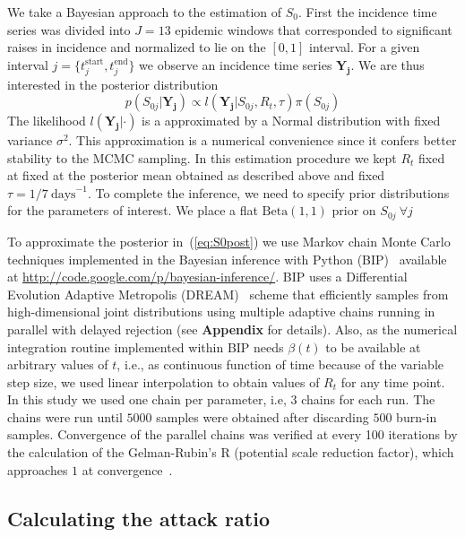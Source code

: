 \documentclass[10pt]{article}
\begin{document}
We take a Bayesian approach to the estimation of $S_0$.
First the incidence time series was divided into $J=13$ 
epidemic windows that corresponded to significant raises in incidence and 
normalized to lie on the $[0,1]$ interval.
For a given interval $j = \{ t_j^{\text{start}}, t_j^{\text{end}} \} $ we 
observe an incidence time series $\mathbf{Y_{j}}$.
We are thus interested in the posterior distribution
\begin{equation}
 \label{eq:S0post}
 p(S_{0j}|\mathbf{Y_{j}}) \propto l(\mathbf{Y_{j}}|S_{0j}, R_t, \tau 
)\pi(S_{0j}) 
\end{equation}
The likelihood $l(\mathbf{Y_{j}}|\cdot)$ is a approximated by a Normal 
distribution with fixed variance $\sigma^2$. This approximation is a numerical 
convenience since it confers better stability to the MCMC sampling.
In this estimation procedure we kept $R_t$ fixed at fixed at the posterior mean 
obtained as described above and fixed $\tau = 1/7\: \text{days}^{-1}$.
To complete the inference, we need to specify prior distributions for the 
parameters of interest.
We place a flat $\text{Beta}(1, 1)$ prior on $S_{0j}\:\forall j$

To approximate the posterior in~(\ref{eq:S0post}) we use Markov chain Monte 
Carlo techniques implemented in the Bayesian inference with Python 
(BIP)~\citep{pone2011} available at  
\url{http://code.google.com/p/bayesian-inference/}.
BIP uses a Differential Evolution Adaptive Metropolis (DREAM)~\citep{vrugt2008} 
scheme that efficiently samples from high-dimensional joint distributions using 
multiple adaptive chains running in parallel with delayed rejection (see 
\textbf{Appendix} for details).
Also, as the numerical integration routine implemented within BIP needs 
$\beta(t)$ to be available at 
arbitrary values of $t$, i.e., as continuous function of time because of the 
variable step size, we used linear interpolation to obtain values of $R_t$ for 
any time point.
In this study we used one chain per parameter, i.e, 3 chains for each run.
The chains were run until $5000$ samples were obtained after discarding $500$ 
burn-in samples.
Convergence of the parallel chains was verified at every 100 iterations by the 
calculation of the Gelman-Rubin's R (potential scale 
reduction factor), which approaches $1$ at convergence~\citep{brooks1998}.

\subsection*{Calculating the attack ratio}
\end{document}
